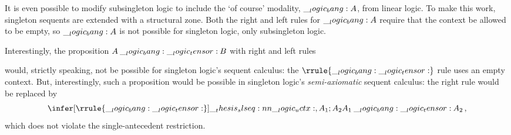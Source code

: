 It is even possible to modify subsingleton logic to include the \enquote*{of course} modality, $\__logic_bang: A$, from linear logic.
To make this work, singleton sequents are extended with a structural zone.
Both the right and left rules for $\__logic_bang: A$ require that the context be allowed to be empty, so $\__logic_bang: A$ is not possible for singleton logic, only subsingleton logic.

Interestingly, the proposition $A \mathbin{\__logic_bang:\mathord{\__logic_tensor:}} B$ with right and left rules
would, strictly speaking, not be possible for singleton logic's sequent calculus: the $\rrule{\mathord{\bang\mathord{\tensor}}}$ rule uses an empty context.
But, interestingly, such a proposition would be possible in singleton logic's \emph{semi-axiomatic} sequent calculus:
the right rule would be replaced by
\begin{equation*}
  \infer[\rrule{\bang\tensor}]{\slseq{\uctx, A_1 ; A_2 |- A_1 \mathbin{\bang\tensor} A_2}}{}
  \,,
\end{equation*}
which does not violate the single-antecedent restriction.







